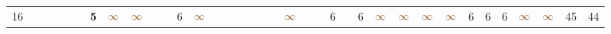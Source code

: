 \begin{landscape}
\begin{table}
\begin{adjustwidth}{-2.6cm}{}
{\begin{tabular}{l|lllllllllllllllllllllllllllllllll|ll}
		16   &            &                                                                 &                                                                 &                                                                 &                                                                 & \textbf{5}                                                      & $\textcolor[rgb]{0.541,0.29,0.043}{\infty}$ & $\textcolor[rgb]{0.541,0.29,0.043}{\infty}$ &                                                                 &                                                                 & 6                                                               & $\textcolor[rgb]{0.541,0.29,0.043}{\infty}$ &                                                                 &                                                                 &                                                                 &                                                                 &                                                                 &                                                                 & $\textcolor[rgb]{0.541,0.29,0.043}{\infty}$ &                                                                 &                                                                 & 6                                                               &                                                                 & 6                                                               & $\textcolor[rgb]{0.541,0.29,0.043}{\infty}$ & $\textcolor[rgb]{0.541,0.29,0.043}{\infty}$ & $\textcolor[rgb]{0.541,0.29,0.043}{\infty}$ & $\textcolor[rgb]{0.541,0.29,0.043}{\infty}$ & 6                                                               & 6                                                               & 6                                                               & $\textcolor[rgb]{0.541,0.29,0.043}{\infty}$ & $\textcolor[rgb]{0.541,0.29,0.043}{\infty}$ & 45         & 44          \\

\end{tabular}}
\end{adjustwidth}
\end{table}
\end{landscape}
